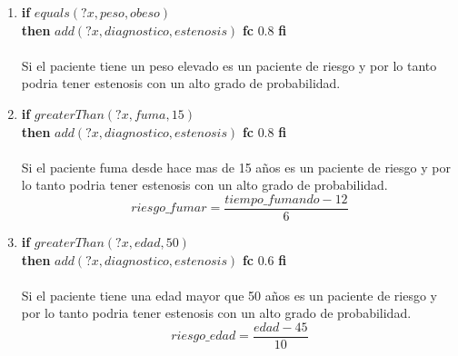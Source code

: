 \documentclass[10pt, a4paper,spanish]{article}
\begin{document}
\begin{enumerate}[label={\textbf{R\theenumi:}}]
				\item
					\textbf{if} $equals(?x, peso, obeso)$ \\
					\textbf{then} $add(?x, diagnostico, estenosis)$ \textbf{fc} $0.8$ \textbf{fi}
					\\ \\
					Si el paciente tiene un peso elevado es un paciente de riesgo y por lo tanto podria tener estenosis con un alto grado de probabilidad.

				\item
					\textbf{if} $greaterThan(?x, fuma, 15)$ \\
					\textbf{then} $add(?x, diagnostico, estenosis)$ \textbf{fc} $0.8$ \textbf{fi}
					\\ \\
					Si el paciente fuma desde hace mas de 15 años es un paciente de riesgo y por lo tanto podria tener estenosis con un alto grado de probabilidad.
					\[
						riesgo\_fumar = \frac{tiempo\_fumando-12}{6}
					\]
					\newline
					\begin{center}
					\end{center}


				\item
					\textbf{if} $greaterThan(?x, edad, 50)$ \\
					\textbf{then} $add(?x, diagnostico, estenosis)$ \textbf{fc} $0.6$ \textbf{fi}
					\\ \\
					Si el paciente tiene una edad mayor que 50 años es un paciente de riesgo y por lo tanto podria tener estenosis con un alto grado de probabilidad.
					\[
						riesgo\_edad = \frac{edad - 45}{10}
					\]
					\newline
					\begin{center}
					\end{center}


\end{enumerate}
\end{document}
